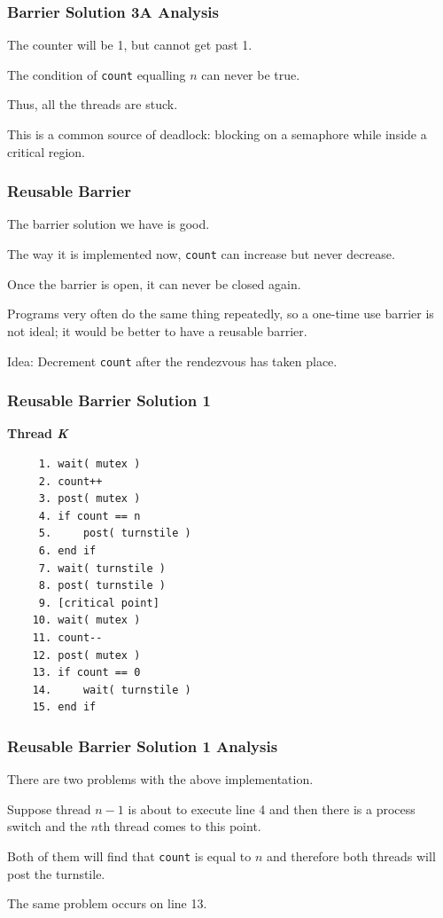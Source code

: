 \begin{frame}
	\frametitle{Barrier Solution 3A Analysis}

	The counter will be 1, but cannot get past 1.

	The condition of \texttt{count} equalling $n$ can never be true.

	Thus, all the threads are stuck.

	This is a common source of deadlock: blocking on a semaphore while inside a critical region.

\end{frame}

\begin{frame}
	\frametitle{Reusable Barrier}

	The barrier solution we have is good.

	The way it is implemented now, \texttt{count} can increase but never decrease.

	Once the barrier is open, it can never be closed again.

	Programs very often do the same thing repeatedly, so a one-time use barrier is not ideal; it would be better to have a reusable barrier.

	Idea: Decrement \texttt{count} after the rendezvous has taken place.

\end{frame}

\begin{frame}[fragile]
	\frametitle{Reusable Barrier Solution 1}

	\textbf{Thread \textit{K}}\vspace{-2em}
	\begin{verbatim}
	 1. wait( mutex )
	 2. count++
	 3. post( mutex )
	 4. if count == n
	 5.     post( turnstile )
	 6. end if
	 7. wait( turnstile )
	 8. post( turnstile )
	 9. [critical point]
	10. wait( mutex )
	11. count--
	12. post( mutex )
	13. if count == 0
	14.     wait( turnstile )
	15. end if
  \end{verbatim}
	\vspace{-2em}

\end{frame}

\begin{frame}
	\frametitle{Reusable Barrier Solution 1 Analysis}

	There are two problems with the above implementation.

	Suppose thread $n-1$ is about to execute line 4 and then there is a process switch and the $n$th thread comes to this point.

	Both of them will find that \texttt{count} is equal to $n$ and therefore both threads will post the turnstile.

	The same problem occurs on line 13.


\end{frame}

